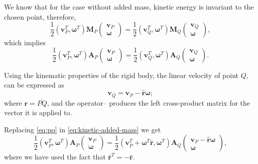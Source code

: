 \documentclass[onecolumn]{article}
\begin{document}
We know that for the case without added mass, kinetic energy is invariant to the chosen point, therefore,
\begin{equation}
    \frac{1}{2} \left( \bm{v}_P^T, \bm{\omega}^T \right) \bm{M}_P
    \left(
    \begin{array}{c}
        \bm{v}_P \\
        \bm{\omega}
    \end{array}
    \right)
    = \frac{1}{2} \left( \bm{v}_Q^T, \bm{\omega}^T \right) \bm{M}_Q
    \left(
    \begin{array}{c}
        \bm{v}_Q \\
        \bm{\omega}
    \end{array}
    \right),
\end{equation}
which implies
\begin{equation}
    \frac{1}{2} \left( \bm{v}_P^T, \bm{\omega}^T \right) \bm{A}_P
    \left(
    \begin{array}{c}
        \bm{v}_P \\
        \bm{\omega}
    \end{array}
    \right)
    = \frac{1}{2} \left( \bm{v}_Q^T, \bm{\omega}^T \right) \bm{A}_Q
    \left(
    \begin{array}{c}
        \bm{v}_Q \\
        \bm{\omega}
    \end{array}
    \right).
    \label{eq:kinetic-added-mass}
\end{equation}

Using the kinematic properties of the rigid body, the linear velocity of point $Q$, can be expressed as
\begin{equation}
    \bm{v}_Q = \bm{v}_P - \hat{\bm{r}} \bm{\omega};
    \label{eq:pq}
\end{equation}
where $\bm{r} = \overline{PQ}$, and the operator $\hat{\,}$ produces the left cross-product matrix for the vector it is applied to.

Replacing \eqref{eq:pq} in \eqref{eq:kinetic-added-mass} we get
\begin{equation}
    \frac{1}{2} \left( \bm{v}_P^T, \bm{\omega}^T \right) \bm{A}_P
    \left(
    \begin{array}{c}
        \bm{v}_P \\
        \bm{\omega}
    \end{array}
    \right)
    = \frac{1}{2} \left( \bm{v}_P^T + \bm{\omega}^T \hat{\bm{r}}, \bm{\omega}^T \right) \bm{A}_Q
    \left(
    \begin{array}{c}
        \bm{v}_P - \hat{\bm{r}} \bm{\omega} \\
        \bm{\omega}
    \end{array}
    \right),
    \label{eq:kinetic-added-mass-2}
\end{equation}
where we have used the fact that $\hat{\bm{r}}^T = -\hat{\bm{r}}$.
\end{document}
